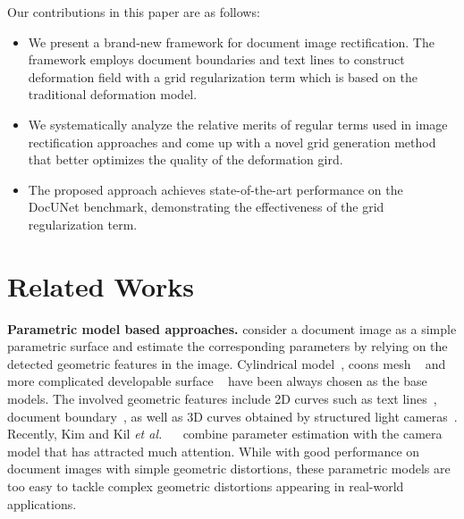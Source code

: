 \documentclass[10pt,twocolumn,letterpaper]{article}
\newcommand{\myparagraph}[1]{\vspace{1pt} \noindent \textbf{#1} }
\begin{document}
{
Our contributions in this paper are as follows:
\begin{itemize}
\item We present a brand-new framework for document image rectification. The framework employs document boundaries and text lines to construct deformation field with a grid regularization term which is based on the traditional deformation model.
\item We systematically analyze the relative merits of regular terms used in image rectification approaches and come up with a novel grid generation method that better optimizes the quality of the deformation gird. 
\item The proposed approach achieves state-of-the-art performance on the DocUNet benchmark, demonstrating the effectiveness of the grid regularization term.
\end{itemize}                      
}

\section{Related Works}
\label{sec:relat}

\myparagraph{Parametric model based approaches.} consider a document image as a simple parametric surface and estimate the corresponding parameters by relying on the detected geometric features in the image. Cylindrical model~\cite{courteille2007shape,koo2009composition,liang2008geometric,cao2003cylindrical}, coons mesh ~\cite{farin1999discrete} and more complicated developable surface ~\cite{liang2005flattening,brown2004image,gumerov2004structure} have been always chosen as the base models. The involved geometric features include 2D curves such as text lines~\cite{lu2006document,stamatopoulos2010goal}, document boundary~\cite{cao2003rectifying}, as well as 3D curves obtained by structured light cameras~\cite{brown2001document,meng2014active}. Recently, Kim and Kil {\em et al.} ~\cite{kil2017robust}~\cite{kim2015document} combine parameter estimation with the camera model that has attracted much attention.
While with good performance on document images with simple geometric distortions, these parametric models are too easy to tackle complex geometric distortions appearing in real-world applications. 
\end{document}
